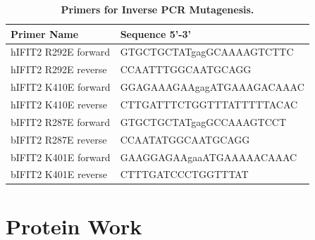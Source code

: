 \begin{table}
\centering
\begin{tabular}{ll}
\hline
\textbf{Primer Name}   & \textbf{Sequence 5'-3'}    \\ \hline
hIFIT2   R292E forward & GTGCTGCTATgagGCAAAAGTCTTC  \\ \hline
hIFIT2 R292E reverse   & CCAATTTGGCAATGCAGG         \\ \hline
hIFIT2   K410E forward & GGAGAAAGAAgagATGAAAGACAAAC \\ \hline
hIFIT2 K410E reverse   & CTTGATTTCTGGTTTATTTTTACAC  \\ \hline
bIFIT2   R287E forward & GTGCTGCTATgagGCCAAAGTCCT   \\ \hline
bIFIT2 R287E reverse   & CCAATATGGCAATGCAGG         \\ \hline
bIFIT2   K401E forward & GAAGGAGAAgaaATGAAAAACAAAC  \\ \hline
bIFIT2 K401E reverse   & CTTTGATCCCTGGTTTAT         \\ \hline
\end{tabular}
\caption[Primers for Inverse PCR Mutagenesis.]{\textbf{Primers for Inverse PCR Mutagenesis.}}
\label{tab:Primers for Inverse PCR Mutagenesis table}
\end{table}




\section{Protein Work} \label{sec:Protein Work}
